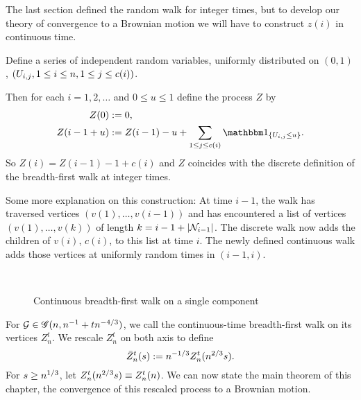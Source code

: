 The last section defined the random walk for integer times,
but to develop our theory of convergence to a Brownian motion
we will have to construct $z(i)$ in continuous time.

Define a series of independent random variables, 
uniformly distributed on $(0,1)$, 
$(U_{i,j}, 1 \leq i \leq n, 1 \leq j \leq c(i))$.

Then for each $i = 1, 2, \dots$ and $0 \leq u \leq 1$ define the process $Z$ by
\begin{equation} \label{E: def Z}
\begin{aligned}
Z(0) &:= 0, \\
Z(i - 1 + u) &:= Z(i-1) - u + \sum_{1 \leq j \leq c(i)} \Ind{\{ \Uij \leq u \}}.
\end{aligned}
\end{equation}
So $Z(i) = Z(i-1) - 1 + c(i)$ 
and $Z$ coincides with the discrete definition of the breadth-first walk at integer times.

Some more explanation on this construction:
At time $i-1$, 
the walk has traversed vertices
$(v(1), \dots, v(i-1))$
and has encountered a list of vertices
$(v(1), \dots, v(k))$
of length
$k = i-1 + |\mathcal{N}_{i-1}|$.
The discrete walk now adds the children of $v(i)$,
$c(i)$, to this list at time $i$.
The newly defined continuous walk adds those vertices at uniformly random times in $(i-1, i)$.

\begin{figure}[H]
	\centering
	\\
	
	\centering
	
	\caption{Continuous breadth-first walk on a single component}
	\label{F: bf-walk cont}
\end{figure} 


For $\mathcal{G} \in \mathscr{G}(n, n^{-1} + tn^{-4/3})$, 
we call the continuous-time breadth-first walk on its vertices $Z_n^t$.
We rescale $Z_n^t$ on both axis to define
\begin{equation} \label{E: def Zbar}
\bar{Z}^t_n(s) := n^{-1 / 3} Z_n^t(n^{2 / 3}s).
\end{equation}
For $s \geq n^{1 / 3}$, 
let $Z_n^t(n^{2 / 3}s) \equiv Z_n^t(n)$.
We can now state the main theorem of this chapter,
the convergence of this rescaled process to a Brownian motion.

